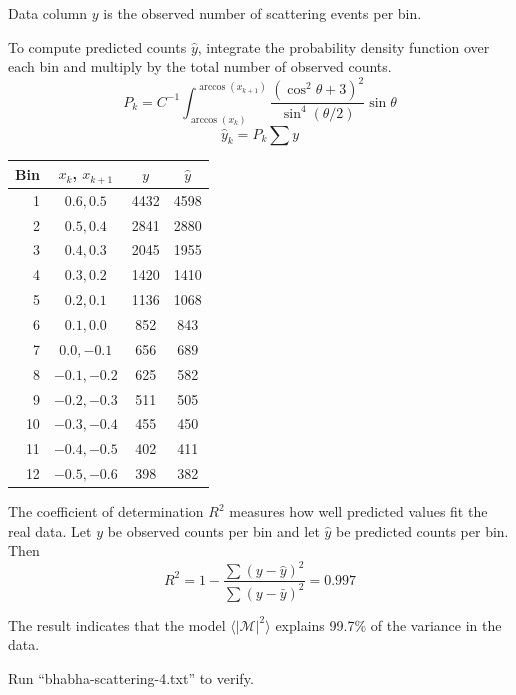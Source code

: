\documentclass[12pt]{article}
\begin{document}
\noindent
Data column $y$ is the observed number of scattering events per bin.

\bigskip
\noindent
To compute predicted counts $\hat{y}$, integrate the probability density function
over each bin and multiply by the total number of observed counts.
\begin{equation*}
P_k=C^{-1}\int_{\arccos(x_k)}^{\arccos(x_{k+1})}
\frac{\left(\cos^2\theta+3\right)^2}{\sin^4(\theta/2)}\sin\theta
\end{equation*}
\begin{equation*}
\hat{y}_k=P_k\sum y
\end{equation*}

\noindent

\begin{center}
\begin{tabular}{|r|c|c|c|}
\hline
Bin & $x_k$, $x_{k+1}$ & $y$ & $\hat{y}$ \\
\hline
1 & $0.6, 0.5$ & 4432 & 4598\\
2 & $0.5, 0.4$ & 2841 & 2880\\
3 & $0.4, 0.3$ & 2045 & 1955\\
4 & $0.3, 0.2$ & 1420 & 1410\\
5 & $0.2, 0.1$ & 1136 & 1068\\
6 & $0.1, 0.0$ & 852 & 843\\
7 & $0.0, -0.1$ & 656 & 689\\
8 & $-0.1, -0.2$ & 625 & 582\\
9 & $-0.2, -0.3$ & 511 & 505\\
10 & $-0.3, -0.4$ & 455 & 450\\
11 & $-0.4, -0.5$ & 402 & 411\\
12 & $-0.5, -0.6$ & 398 & 382\\
\hline
\end{tabular}
\end{center}

\noindent
The coefficient of determination $R^2$ measures how well predicted values fit the real data.
Let $y$ be observed counts per bin and let $\hat{y}$ be predicted counts per bin.
Then
\begin{equation*}
R^2=1-\frac{\sum(y-\hat{y})^2}{\sum(y-\bar{y})^2}=0.997
\end{equation*}

\noindent
The result indicates that the model $\langle|\mathcal{M}|^2\rangle$ explains
99.7\% of the variance in the data.

\bigskip
\noindent
Run ``bhabha-scattering-4.txt'' to verify.
\end{document}
